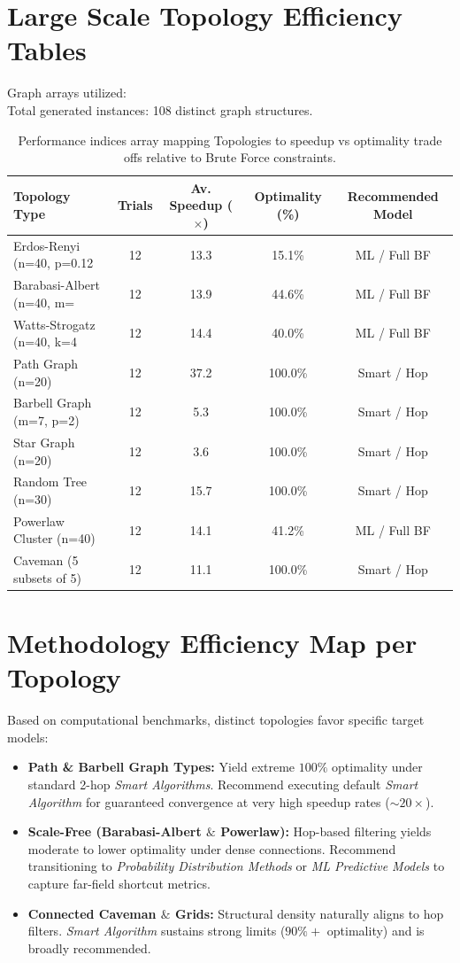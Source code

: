 \documentclass[11pt]{article}
\begin{document}
\section{Large Scale Topology Efficiency Tables}
Graph arrays utilized: \\
Total generated instances: 108 distinct graph structures.\\
\begin{table}[H]
    \centering
    \begin{tabular}{l c c c c}
        \toprule
        \textbf{Topology Type} & \textbf{Trials} & \textbf{Av. Speedup ($\times$)} & \textbf{Optimality (\%)} & \textbf{Recommended Model} \\
        \midrule
        Erdos-Renyi (n=40, p=0.12 & 12 & 13.3 & 15.1\% & ML / Full BF \\
        Barabasi-Albert (n=40, m= & 12 & 13.9 & 44.6\% & ML / Full BF \\
        Watts-Strogatz (n=40, k=4 & 12 & 14.4 & 40.0\% & ML / Full BF \\
        Path Graph (n=20) & 12 & 37.2 & 100.0\% & Smart / Hop \\
        Barbell Graph (m=7, p=2) & 12 & 5.3 & 100.0\% & Smart / Hop \\
        Star Graph (n=20) & 12 & 3.6 & 100.0\% & Smart / Hop \\
        Random Tree (n=30) & 12 & 15.7 & 100.0\% & Smart / Hop \\
        Powerlaw Cluster (n=40) & 12 & 14.1 & 41.2\% & ML / Full BF \\
        Caveman (5 subsets of 5) & 12 & 11.1 & 100.0\% & Smart / Hop \\
        \bottomrule
    \end{tabular}
    \caption{Performance indices array mapping Topologies to speedup vs optimality trade offs relative to Brute Force constraints.}
\end{table}

\section{Methodology Efficiency Map per Topology}
Based on computational benchmarks, distinct topologies favor specific target models:

\begin{itemize}
    \item \textbf{Path \& Barbell Graph Types:} Yield extreme $100\%$ optimality under standard 2-hop \textit{Smart Algorithms}. Recommend executing default \textit{Smart Algorithm} for guaranteed convergence at very high speedup rates ($\sim 20\times$).
    \item \textbf{Scale-Free (Barabasi-Albert $\&$ Powerlaw):} Hop-based filtering yields moderate to lower optimality under dense connections. Recommend transitioning to \textit{Probability Distribution Methods} or \textit{ML Predictive Models} to capture far-field shortcut metrics.
    \item \textbf{Connected Caveman $\&$ Grids:} Structural density naturally aligns to hop filters. \textit{Smart Algorithm} sustains strong limits ($90\%+$ optimality) and is broadly recommended.
\end{itemize}
\end{document}
